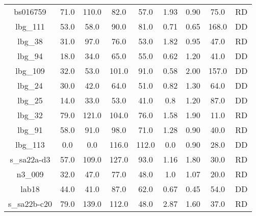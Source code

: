\documentclass[fleqn,usenatbib]{mn2e}
\begin{document}
\begin{table*}
\begin{threeparttable}
\begin{tabular}{ccccccccc}
bs016759        & 71.0                    & 110.0                    & 82.0                  & 57.0                   & 1.93        & 0.90       & 75.0 & RD \\
lbg\_111        & 53.0                    & 58.0                     & 90.0                  & 81.0                   & 0.71      & 0.65        & 168.0 & DD \\
lbg\_38         & 31.0                    & 97.0                     & 76.0                  & 53.0                   & 1.82        & 0.95       & 47.0 & RD \\
lbg\_94         & 18.0                    & 34.0                     & 65.0                  & 55.0                   & 0.62       & 1.20       & 41.0 & DD \\
lbg\_109        & 32.0                    & 53.0                     & 101.0                 & 91.0                   & 0.58      & 2.00        & 157.0 & DD \\
lbg\_24         & 30.0                    & 42.0                     & 64.0                  & 51.0                   & 0.82      & 1.30       & 64.0 & DD  \\
lbg\_25         & 14.0                    & 33.0                     & 53.0                  & 41.0                   & 0.8       & 1.20        & 87.0 & DD  \\
lbg\_32         & 79.0                    & 121.0                    & 104.0                 & 76.0                   & 1.58       & 1.90       & 11.0 & RD  \\
lbg\_91         & 58.0                    & 91.0                     & 98.0                  & 71.0                   & 1.28       & 0.90        & 40.0 & RD \\
lbg\_113        & 0.0                    & 0.0                      & 116.0                 & 112.0                  & 0.0         & 0.90       & 28.0 & DD \\
s\_sa22a-d3   & 57.0                    & 109.0                    & 127.0                 & 93.0                   & 1.16        & 1.80       & 30.0 & RD \\
n3\_009       & 32.0                    & 47.0                     & 77.0                  & 48.0                   & 1.0       & 1.07       & 20.0 & RD  \\
lab18         & 44.0                    & 41.0                     & 87.0                  & 62.0                   & 0.67     & 0.45       & 54.0 &  DD  \\
s\_sa22b-c20  & 79.0                    & 139.0                    & 112.0                 & 48.0                   & 2.87       & 1.60       & 37.0 & RD  \\

\end{tabular}
\end{threeparttable}
\end{table*}
\end{document}
